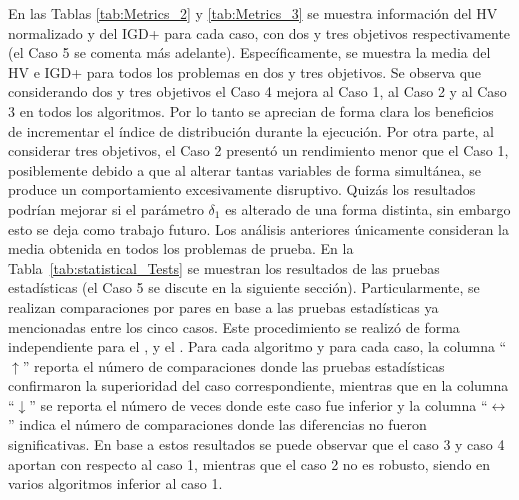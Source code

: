 En las Tablas \ref{tab:Metrics_2} y \ref{tab:Metrics_3} se muestra información del HV normalizado \cite{zitzler1999multiobjective} y del IGD+ \cite{Joel:IGDPlus_And_GDPlus} para cada caso, con
dos y tres objetivos respectivamente (el Caso 5 se comenta más adelante).
%
Específicamente, se muestra la media del HV e IGD+ para todos los problemas en dos y tres objetivos.
%
Se observa que considerando dos y tres objetivos el Caso 4 mejora al Caso 1, al Caso 2 y al Caso 3 en todos los algoritmos.
%
Por lo tanto se aprecian de forma clara los beneficios de incrementar el índice de distribución durante la ejecución.
%
Por otra parte, al considerar tres objetivos, el Caso 2 presentó un rendimiento menor que el Caso 1, 
posiblemente debido a que al alterar tantas variables de forma simultánea, se produce un comportamiento excesivamente disruptivo.
%
Quizás los resultados podrían mejorar si el parámetro $\delta_1$ es alterado de una forma distinta, sin embargo esto se deja como trabajo futuro.
%
Los análisis anteriores únicamente consideran la media obtenida en todos los problemas de prueba.
%
En la Tabla~\ref{tab:statistical_Tests} se muestran los resultados de las pruebas estadísticas (el Caso 5 se discute en la siguiente sección).
%
Particularmente, se realizan comparaciones por pares en base a las pruebas estadísticas ya mencionadas entre los cinco casos.
%
Este procedimiento se realizó de forma independiente para el \NSGAII{}, \MOEAD{} y el \SMSEMOA{}.
%
Para cada algoritmo y para cada caso, la columna ``$\uparrow$'' reporta el número de comparaciones donde las pruebas estadísticas confirmaron 
la superioridad del caso correspondiente, mientras que en la columna ``$\downarrow$'' se reporta el número de veces donde este caso fue inferior 
y la columna ``$\longleftrightarrow$'' indica el número de comparaciones donde las diferencias no fueron significativas.
%
En base a estos resultados se puede observar que el caso 3 y caso 4 aportan con respecto al caso 1, mientras que el caso 2 no es
robusto, siendo en varios algoritmos inferior al caso 1.
%
%
%
